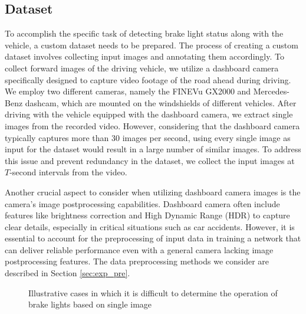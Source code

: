 \subsection{Dataset}
\label{sec:method_dataset}
To accomplish the specific task of detecting brake light status along with the vehicle, a custom dataset needs to be prepared.
The process of creating a custom dataset involves collecting input images and annotating them accordingly.
To collect forward images of the driving vehicle, we utilize a dashboard camera specifically designed to capture video footage of the road ahead during driving. 
We employ two different cameras, namely the FINEVu GX2000 and Mercedes-Benz dashcam, which are mounted on the windshields of different vehicles.
After driving with the vehicle equipped with the dashboard camera, we extract single images from the recorded video.
However, considering that the dashboard camera typically captures more than 30 images per second, using every single image as input for the dataset would result in a large number of similar images.
To address this issue and prevent redundancy in the dataset, we collect the input images at $T$-second intervals from the video.

Another crucial aspect to consider when utilizing dashboard camera images is the camera's image postprocessing capabilities.
Dashboard camera often include features like brightness correction and High Dynamic Range (HDR) to capture clear details, especially in critical situations such as car accidents.
However, it is essential to account for the preprocessing of input data in training a network that can deliver reliable performance even with a general camera lacking image postprocessing features. 
The data preprocessing methods we consider are described in Section \ref{sec:exp_pre}.

\begin{figure}[b!]%

    \hfill

\caption{Illustrative cases in which it is difficult to determine the operation of brake lights based on single image} 
\label{fig:label_hard}%
\end{figure}

